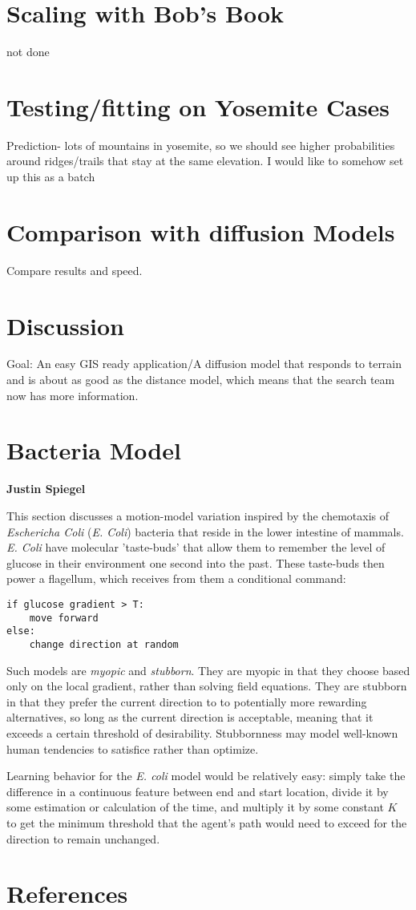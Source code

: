 \documentclass[]{article}
\begin{document}
\section{Scaling with Bob's Book}
not done
\section{Testing/fitting on Yosemite Cases}
Prediction- lots of mountains in yosemite, so we should see higher probabilities around ridges/trails that stay at the same elevation. I would like to somehow set up this as a batch

\section{Comparison with diffusion Models}
Compare results and speed.
\section{Discussion}
Goal: An easy GIS ready application/A diffusion model that responds to terrain and is about as good as the distance model, which means that the search team now has more information.


\section{Bacteria Model}
\textbf{Justin Spiegel}

This section discusses a motion-model variation inspired by the chemotaxis of \emph{Eschericha Coli} (\emph{E. Coli}) bacteria that reside in the lower intestine of mammals. \emph{E. Coli} have molecular 'taste-buds' that allow them to remember the level of glucose in their environment one second into the past. These taste-buds then power a flagellum, which receives from them a conditional command:
\begin{verbatim}
if glucose gradient > T:
    move forward
else:
    change direction at random
\end{verbatim}
Such models are \emph{myopic} and \emph{stubborn}.  They are myopic in that they choose based only on the local gradient, rather than solving field equations. They are stubborn in that they prefer the current direction to to potentially more rewarding alternatives, so long as the current direction is acceptable, meaning that it exceeds a certain threshold of desirability. Stubbornness may model well-known human tendencies to satisfice rather than optimize.  

Learning behavior for the \emph{E. coli} model would be relatively easy: simply take the difference in a continuous feature between end and start location, divide it by some estimation or calculation of the time, and multiply it by some constant $K$ to get the minimum threshold that the agent's path would need to exceed for the direction to remain unchanged.

\section{References}



\end{document}
